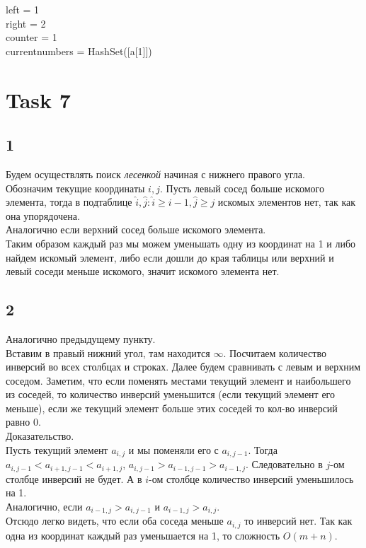 \documentclass[12pt]{exam}
\begin{document}
\begin{algorithm}
    left = 1 \\
    right = 2 \\
    counter = 1 \\
    currentnumbers = HashSet([a[1]]) \\

\end{algorithm}

\section*{Task 7}
\subsection*{1}
Будем осуществлять поиск \textit{лесенкой} начиная с нижнего правого угла. \\
Обозначим текущие координаты $i, j$.
Пусть левый сосед больше искомого элемента, 
тогда в подтаблице $\hat{i}, \hat{j}: \hat{i} \geq i - 1, \hat{j} \geq j$ искомых элементов нет, так как она упорядочена. \\
Аналогично если верхний сосед больше искомого элемента. \\
Таким образом каждый раз мы можем уменьшать одну из координат на 1 и либо найдем искомый элемент, либо 
если дошли до края таблицы или верхний и левый соседи меньше искомого, значит искомого элемента нет.\\

\subsection*{2}
Аналогично предыдущему пункту.\\
Вставим в правый нижний угол, там находится $\infty$.
Посчитаем количество инверсий во всех столбцах и строках.
Далее будем сравнивать с левым и верхним соседом. 
Заметим, что если поменять местами текущий элемент 
и наибольшего из соседей, то количество инверсий уменьшится
(если текущий элемент его меньше), 
если же текущий элемент больше этих соседей то 
кол-во инверсий равно 0. \\
Доказательство.\\
Пусть текущий элемент $a_{i, j}$ и мы поменяли его 
с $a_{i, j-1}$. Тогда $a_{i, j-1} < a_{i+1, j-1} < a_{i+1, j}$, 
$a_{i, j-1} > a_{i-1, j-1} > a_{i-1, j}$. 
Следовательно в $j$-ом столбце инверсий не будет. 
А в $i$-ом столбце количество инверсий уменьшилось на 1.\\
Аналогично, если $a_{i-1, j} > a_{i, j-1}$ и $a_{i-1, j} > a_{i, j}$.\\
Отсюдо легко видеть, что если оба соседа меньше $a_{i, j}$ то инверсий нет.
Так как одна из координат каждый раз уменьшается на 1, то сложность $O(m + n)$.
\end{document}
